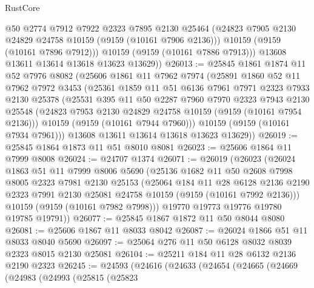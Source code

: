 \begin{lexlean}{RustCore}
\begin{coremodule}
            @50
            @2774
            @7912
            @7922
            @2323
            @7895
            @2130
            @25464
            (@24823 @7905 @2130 @24829 @24758 @10159 (@9159 (@10161 @7906 @2136)))
            @10159
            (@9159 (@10161 @7896 @7912)))
          @10159
          (@9159 (@10161 @7886 @7913)))
        @13608
        @13611
        @13614
        @13618
        @13623
        @13629))
@26013 := @25845
    @1861
    @1874
    @11
    @52
    @7976
    @8082
    (@25606
      @1861
      @11
      @7962
      @7974
      (@25891
        @1860
        @52
        @11
        @7962
        @7972
        @3453
        (@25361
          @1859
          @11
          @51
          @6136
          @7961
          @7971
          @2323
          @7933
          @2130
          @25378
          (@25531
            @395
            @11
            @50
            @2287
            @7960
            @7970
            @2323
            @7943
            @2130
            @25548
            (@24823 @7953 @2130 @24829 @24758 @10159 (@9159 (@10161 @7954 @2136)))
            @10159
            (@9159 (@10161 @7944 @7960)))
          @10159
          (@9159 (@10161 @7934 @7961)))
        @13608
        @13611
        @13614
        @13618
        @13623
        @13629))
@26019 := @25845 @1864 @1873 @11 @51 @8010 @8081
@26023 := @25606 @1864 @11 @7999 @8008
@26024 := @24707 @1374
@26071 := @26019
    (@26023
      (@26024
        @1863
        @51
        @11
        @7999
        @8006
        @5690
        (@25136
          @1682
          @11
          @50
          @2608
          @7998
          @8005
          @2323
          @7981
          @2130
          @25153
          (@25064
            @184
            @11
            @28
            @6128
            @2136
            @2190
            @2323
            @7991
            @2130
            @25081
            @24758
            @10159
            (@9159 (@10161 @7992 @2136)))
          @10159
          (@9159 (@10161 @7982 @7998)))
        @19770
        @19773
        @19776
        @19780
        @19785
        @19791))
@26077 := @25845 @1867 @1872 @11 @50 @8044 @8080
@26081 := @25606 @1867 @11 @8033 @8042
@26087 := @26024 @1866 @51 @11 @8033 @8040 @5690
@26097 := @25064 @276 @11 @50 @6128 @8032 @8039 @2323 @8015 @2130 @25081
@26104 := @25211 @184 @11 @28 @6132 @2136 @2190 @2323
@26245 := @24593
    (@24616
      (@24633
        (@24654
          (@24665
            (@24669
              (@24983
                (@24993
                  (@25815
                    (@25823

\end{coremodule}
\end{lexlean}
